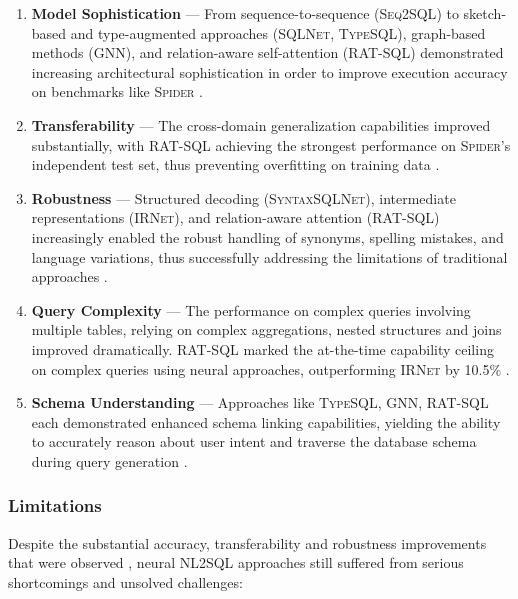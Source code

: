 \begin{enumerate}
    \item \textbf{Model Sophistication} — From sequence-to-sequence
        (\textsc{Seq2SQL}) to sketch-based and type-augmented approaches
        (\textsc{SQLNet}, \textsc{TypeSQL}), graph-based methods
        (\textsc{GNN}), and relation-aware self-attention (\textsc{RAT-SQL})
        demonstrated increasing architectural sophistication in order to
        improve execution accuracy on benchmarks like \textsc{Spider}
        \citep{Seq2SQL, TypeSQL, GNN, SyntaxSQLNet, RATSQL}.
    \item \textbf{Transferability} — The cross-domain generalization
        capabilities improved substantially, with RAT-SQL achieving the
        strongest performance on \textsc{Spider}'s independent test set,
        thus preventing overfitting on training data \citep{RATSQL}.
    \item \textbf{Robustness} — Structured decoding (\textsc{SyntaxSQLNet}),
        intermediate representations (\textsc{IRNet}), and relation-aware
        attention (\textsc{RAT-SQL}) increasingly enabled the robust handling
        of synonyms, spelling mistakes, and language variations, thus
        successfully addressing the limitations of traditional approaches
        \citep{SyntaxSQLNet, IRNet, RATSQL}.
    \item \textbf{Query Complexity} — The performance on complex queries
        involving multiple tables, relying on complex aggregations, nested
        structures and joins improved dramatically. \textsc{RAT-SQL} marked the
        at-the-time capability ceiling on complex queries using neural
        approaches, outperforming \textsc{IRNet} by 10.5\% \citep{IRNet,
        RATSQL}.
    \item \textbf{Schema Understanding} — Approaches like \textsc{TypeSQL},
        \textsc{GNN}, \textsc{RAT-SQL} each demonstrated enhanced schema
        linking capabilities, yielding the ability to accurately reason about
        user intent and traverse the database schema during query generation
        \citep{TypeSQL, GNN, RATSQL}.
\end{enumerate}

\subsubsection{Limitations}

Despite the substantial accuracy, transferability and robustness improvements
that were observed \citep{IRNet, RATSQL}, neural NL2SQL approaches still
suffered from serious shortcomings and unsolved challenges:

